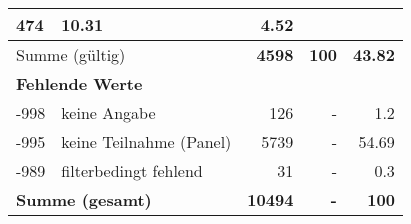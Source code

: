 \begin{longtable}{lXrrr}
       \num{474} &
       \num[round-mode=places,round-precision=2]{10.31} &
         \num[round-mode=places,round-precision=2]{4.52} \\
     \midrule
     \multicolumn{2}{l}{Summe (gültig)} &
       \textbf{\num{4598}} &
     \textbf{\num{100}} &
       \textbf{\num[round-mode=places,round-precision=2]{43.82}} \\
     \multicolumn{5}{l}{\textbf{Fehlende Werte}}\\
       -998 &
       keine Angabe &
         \num{126} &
        - &
         \num[round-mode=places,round-precision=2]{1.2} \\
       -995 &
       keine Teilnahme (Panel) &
         \num{5739} &
        - &
         \num[round-mode=places,round-precision=2]{54.69} \\
       -989 &
       filterbedingt fehlend &
         \num{31} &
        - &
         \num[round-mode=places,round-precision=2]{0.3} \\
     \midrule
     \multicolumn{2}{l}{\textbf{Summe (gesamt)}} &
          \textbf{\num{10494}} &
        \textbf{-} &
        \textbf{\num{100}} \\
     \bottomrule
     \end{longtable}
     
